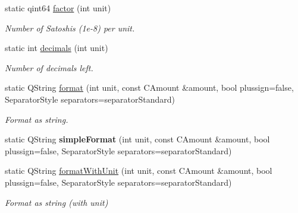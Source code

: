 \begin{Indent}
\begin{DoxyCompactItemize}
\mbox{\label{class_bitcoin_units_ae967b9e6ecbb8f041bfe398d27533b09}} 
static qint64 \mbox{\hyperlink{class_bitcoin_units_ae967b9e6ecbb8f041bfe398d27533b09}{factor}} (int unit)
\begin{DoxyCompactList}\small\item\em Number of Satoshis (1e-\/8) per unit. \end{DoxyCompactList}\item 
\mbox{\label{class_bitcoin_units_a3f0fc21634520ea06c684ba0d7e25f2f}} 
static int \mbox{\hyperlink{class_bitcoin_units_a3f0fc21634520ea06c684ba0d7e25f2f}{decimals}} (int unit)
\begin{DoxyCompactList}\small\item\em Number of decimals left. \end{DoxyCompactList}\item 
\mbox{\label{class_bitcoin_units_ab07437e5a788c80a82d75e3714bd3925}} 
static Q\+String \mbox{\hyperlink{class_bitcoin_units_ab07437e5a788c80a82d75e3714bd3925}{format}} (int unit, const C\+Amount \&amount, bool plussign=false, Separator\+Style separators=separator\+Standard)
\begin{DoxyCompactList}\small\item\em Format as string. \end{DoxyCompactList}\item 
\mbox{\label{class_bitcoin_units_ac1919e2899157a9af5ada7495eeca3ea}} 
static Q\+String {\bfseries simple\+Format} (int unit, const C\+Amount \&amount, bool plussign=false, Separator\+Style separators=separator\+Standard)
\item 
\mbox{\label{class_bitcoin_units_aef9fb7509257bc84ee459d7f0c663020}} 
static Q\+String \mbox{\hyperlink{class_bitcoin_units_aef9fb7509257bc84ee459d7f0c663020}{format\+With\+Unit}} (int unit, const C\+Amount \&amount, bool plussign=false, Separator\+Style separators=separator\+Standard)
\begin{DoxyCompactList}\small\item\em Format as string (with unit) \end{DoxyCompactList}\item 
\mbox{\label{class_bitcoin_units_a5f4ef08b81386d393a16001bdfef5d56}} 

\end{DoxyCompactItemize}
\end{Indent}
